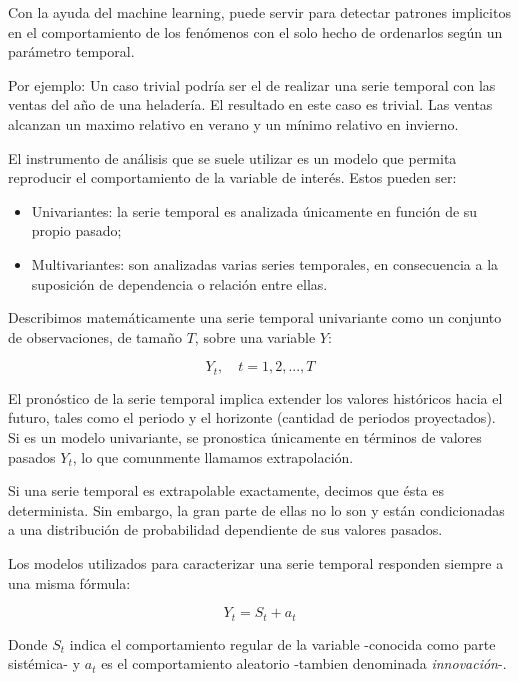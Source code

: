 \documentclass[a4paper,10pt]{article}
\begin{document}
Con la ayuda del machine learning, puede servir para detectar patrones implicitos en el comportamiento de los fenómenos con el solo hecho de ordenarlos según un parámetro temporal.

Por ejemplo: Un caso trivial podría ser el de realizar una serie temporal con las ventas del año de una heladería. El resultado en este caso es trivial. Las ventas alcanzan un maximo relativo en verano y un mínimo relativo en invierno.

El instrumento de análisis que se suele utilizar es
un modelo que permita reproducir el comportamiento de la variable de interés. Estos pueden ser:

\begin{itemize}
 \item Univariantes: la serie temporal es analizada únicamente en función de su propio pasado;

 \item Multivariantes: son analizadas varias series temporales, en consecuencia a la suposición de dependencia o relación entre ellas.
\end{itemize}

Describimos matemáticamente una serie temporal univariante como un conjunto de observaciones, de tamaño $T$, sobre una variable $Y$:

\begin{equation}
 Y_t, \quad t = 1,2,...,T
\end{equation}



El pronóstico de la serie temporal implica extender los valores históricos hacia el futuro, tales como el periodo y el horizonte (cantidad de periodos proyectados). Si es un modelo univariante, se pronostica únicamente en términos de valores pasados $Y_t$, lo que comunmente llamamos extrapolación.

Si una serie temporal es extrapolable exactamente, decimos que ésta es determinista. Sin embargo, la gran parte de ellas no lo son y están condicionadas a una distribución de probabilidad dependiente de sus valores pasados.

Los modelos utilizados para caracterizar una serie temporal responden siempre a una misma fórmula:

\begin{equation}\label{eqn:sistinnov}
 Y_t = S_t + a_t
\end{equation}

Donde $S_t$ indica el comportamiento regular de la variable -conocida como parte sistémica- y $a_t$ es el comportamiento aleatorio -tambien denominada \textit{innovación}-.
\end{document}
